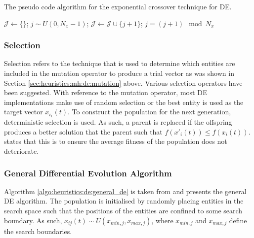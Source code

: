 \begin{algorithm}[H]
    \caption{The pseudo code algorithm for the exponential crossover technique for \ac{DE}.}
    \label{algo:heuristics:de:exp}
    \begin{algorithmic}
        \State $\mathcal{J} \gets \{\}$;
        \State $j \sim U(0,N_{x} - 1)$;
        \Repeat
            \State $\mathcal{J} \gets \mathcal{J} \cup \{j + 1 \}$;
            \State $j = (j+1) \mod N_{x}$
    \end{algorithmic}
\end{algorithm}

\subsubsection{Selection}
\label{sec:heuristics:mh:de:selection}

Selection refers to the technique that is used to determine which entities are included in the mutation operator to produce a trial vector \cite{ref:engelbrecht:2007} as was shown in Section \ref{sec:heuristics:mh:de:mutation} above. Various selection operators have been suggested. With reference to the mutation operator, most \ac{DE} implementations make use of random selection or the best entity is used as the target vector $x_{i_{1}}(t)$. To construct the population for the next generation, deterministic selection is used. As such, a parent is replaced if the offspring produces a better solution that the parent such that $f(x'_{i}(t)) \leq f(x_{i}(t))$. \citeauthor{ref:engelbrecht:2007}\cite{ref:engelbrecht:2007} states that this is to ensure the average fitness of the population does not deteriorate.


\subsubsection{General Differential Evolution Algorithm}

Algorithm \ref{algo:heuristics:de:general_de} is taken from \cite{ref:engelbrecht:2007} and presents the general \ac{DE} algorithm. The population is initialised by randomly placing entities in the search space such that the positions of the entities are confined to some search boundary. As such, $x_{ij}(t) \sim U(x_{min,j}, x_{max,j})$, where $x_{min,j}$ and $x_{max,j}$ define the search boundaries.

